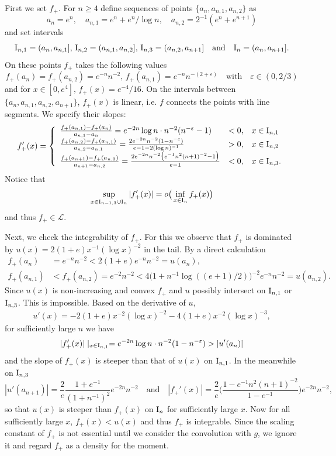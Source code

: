 \documentclass[12pt,leqno]{amsart}
\newcommand{\rI}{{\rm I}}
\newcommand{\vep}{\varepsilon}
\newcommand{\call}{{\mathcal L}}
\newcommand{\1}{{\mathbf 1}}
\begin{document}
First we set $f_+$.  
For $n\ge 4$ define sequences of points $\{a_n,a_{n,1},a_{n,2}\}$ as 
\[
 a_n=e^n,\quad a_{n,1}=e^n+e^n/\log n,\quad a_{n,2} = 2^{-1}(e^n+e^{n+1})
\]
and set intervals 
\[
 \rI_{n,1}=(a_n,a_{n,1}],\,\rI_{n,2}=(a_{n,1},a_{n,2}],\,\rI_{n,3}=(a_{n,2},a_{n+1}]\quad \text{and}\quad \rI_n=(a_n,a_{n+1}]. 
\]
On these points $f_+$ takes the following values 
\[
 f_+(a_n)=f_+(a_{n,2})= e^{-n}n^{-2},\, f_+(a_{n,1})= e^{-n}n^{-(2+\vep)}\quad \text{with}\quad \vep\in (0,2/3)
\]
and for $x\in[0,e^4],\,f_+(x)=e^{-4}/16$. 
On the intervals between $\{a_n,a_{n,1},a_{n,2},a_{n+1}\}$, $f_+(x)$ is linear, i.e. $f$ connects the points with line segments.  
We specify their slopes: 
\begin{align*}
\begin{split}
f_+'(x)= \left\{
\begin{array}{lll}
\frac{f_+(a_{n,1})-f_+(a_{n})}{a_{n,1}-a_{n}}= 
e^{-2n}\log n\cdot n^{-2}(n^{-\vep}-1) & <0, & x\in \rI_{n,1}  \\
\frac{f_+(a_{n,2})-f_+(a_{n,1})}{a_{n,2}-a_{n,1}}= \frac{2e^{-2n} n^{-2}(1-n^{-\vep})}{e-1-2(\log n)^{-1}} & >0, & x\in \rI_{n,2} \\
\frac{f_+(a_{n+1})-f_+(a_{n,2})}{a_{n+1}-a_{n,2}}
= \frac{2e^{-2n}n^{-2}\big(e^{-1}n^2(n+1)^{-2}-1\big)}{e-1} &<0, & x\in \rI_{n,3}.  
\end{array}
\right.
\end{split}
\end{align*}
Notice that 
\[
 \sup_{x\in \rI_{n-1,3}\cup \rI_n}|f_+'(x)|=o\big(\inf_{x\in \rI_n} f_+(x)\big) 
\]
and thus $f_+\in \call$.

Next, we check the integrability of $f_+$. 
For this we observe that $f_+$ is dominated by $u(x)=2(1+e)x^{-1} (\log x)^{-2}$ in the tail.
By a direct calculation 
\begin{align*}
f_+(a_n) &= e^{-n}n^{-2} <2(1+e)e^{-n}n^{-2} =u(a_n), \\
f_+(a_{n,1}) &< f_+(a_{n,2})=e^{-2}n^{-2} < 4 \big(1+n^{-1} \log((e+1)/2) \big)^{-2} e^{-n}n^{-2}=u(a_{n,2}). 
\end{align*}
Since $u(x)$ is non-increasing and convex $f_+$ and $u$ possibly intersect on $\rI_{n,1}$ or $\rI_{n,3}$. 
This is impossible. Based on the derivative of $u$, 
\begin{align}
\label{deriv:u}
 u'(x)=-2(1+e) x^{-2} (\log x)^{-2} -4 (1+e)x^{-2} (\log x)^{-3}, 
\end{align}
for sufficiently large $n$ we have %
\[
 |f_+'(x)| \mid_{x\in\rI_{n,1}} =e^{-2n}\log n \cdot n^{-2} (1-n^{-\vep})>|u'(a_n)|
\]
and the slope of $f_+(x)$ is steeper than that of $u(x)$ on $\rI_{n,1}$. In the meanwhile on $\rI_{n,3}$ 
\[
 |u'(a_{n+1})|=\frac{2}{e} \frac{1+e^{-1}}{(1+n^{-1})^{2}} e^{-2n}n^{-2}\quad\text{and}\quad |f_+'(x)|=\frac{2}{e} 
\Big(
\frac{1-e^{-1}n^2(n+1)^{-2}}{1-e^{-1}}
\Big) e^{-2n}n^{-2}, 
\]
so that $u(x)$ is steeper than $f_+(x)$ on $\rI_n$ for sufficiently large $x$. 
Now for all sufficiently large $x$, $f_+(x)<u(x)$ and thus $f_+$ is integrable. Since the 
scaling constant of $f_+$ is not essential until we consider the convolution with $g$, 
we ignore it and regard $f_+$ as a density for the moment. 
\end{document}
